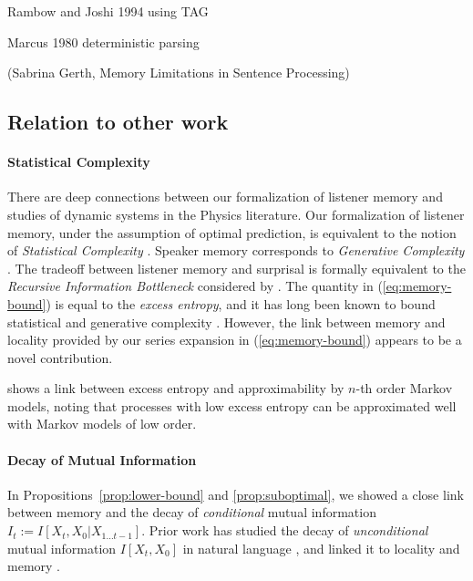 \documentclass[11pt,letterpaper]{article}
\begin{document}
Rambow and Joshi 1994 using TAG

Marcus 1980 deterministic parsing

(Sabrina Gerth, Memory Limitations in Sentence Processing)


\subsection{Relation to other work}

\paragraph{Statistical Complexity}
There are deep connections between our formalization of listener memory and studies of dynamic systems in the Physics literature.
Our formalization of listener memory, under the assumption of optimal prediction, is equivalent to the notion of \emph{Statistical Complexity} \citep{crutchfield-inferring-1989}.
Speaker memory corresponds to \emph{Generative Complexity} \cite{loehr-non-sufficient-2008, loehr-predictive-2010}.
The tradeoff between listener memory and surprisal is formally equivalent to the \emph{Recursive Information Bottleneck} considered by \cite{still-information-2014}.
The quantity in (\ref{eq:memory-bound}) is equal to the \emph{excess entropy}, and it has long been known to bound statistical and generative complexity \citep{crutchfield-inferring-1989}.
However, the link between memory and locality provided by our series expansion in (\ref{eq:memory-bound}) appears to be a novel contribution.


\cite{sharan-prediction-2016} shows a link between excess entropy and approximability by $n$-th order Markov models, noting that processes with low excess entropy can be approximated well with Markov models of low order.



\paragraph{Decay of Mutual Information}
In Propositions~\ref{prop:lower-bound} and \ref{prop:suboptimal}, we showed a close link between memory and the decay of \emph{conditional} mutual information $I_t := I[X_t, X_0 | X_{1\dots t-1}]$.
Prior work has studied the decay of \emph{unconditional} mutual information $I[X_t, X_0]$ in natural language \citep{ebeling-entropy-1994,lin-critical-2017}, and linked it to locality and memory \citep{futrell-noisy-context-2017}.
\end{document}
